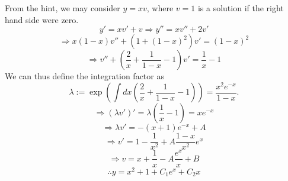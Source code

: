 \item
From the hint, we may consider $y = xv$, where $v = 1$ is a solution if the right hand side were zero.
\[
	y' = xv' + v
	\Rightarrow y'' = xv'' + 2v'
\]
\[
	\Rightarrow x(1 - x) v'' + \left( 1 + {(1 - x)}^2 \right) v' = {(1 - x)}^2
\]
\[
	\Rightarrow v'' + \left( \frac{2}{x} + \frac{1}{1 - x} - 1\right) v' = \frac{1}{x} - 1
\]
We can thus define the integration factor as
\[
	\lambda := \exp \left( \int dx \left( \frac{2}{x} + \frac{1}{1 - x} - 1\right) \right)
	= \frac{x^2 e^{-x}}{1 - x}.
\]
\[
	\Rightarrow (\lambda v')'
	= \lambda \left( \frac{1}{x} - 1 \right)
	= xe^{-x}
\]
\[
	\Rightarrow \lambda v' = -(x + 1) e^{-x} + A
\]
\[
	\Rightarrow v'= 1 - \frac{1}{x^2} + A \frac{1-x}{x^2}e^x
\]
\[
	\Rightarrow v = x + \frac{1}{x} - A \frac{e^x}{x} + B
\]
\[
	\therefore y = x^2 + 1 + C_1 e^x + C_2 x
\]